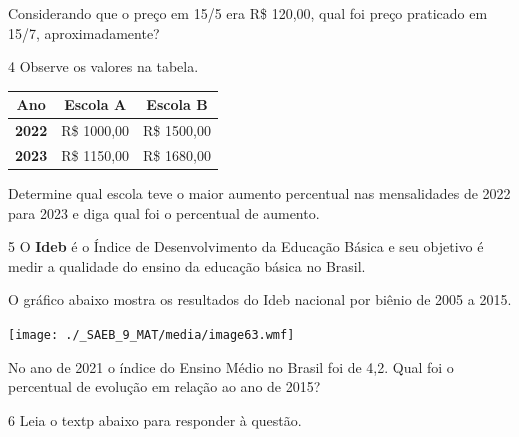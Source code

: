 \begin{escolha}
\begin{boxmedio}
\begin{boxmedio}
{\begin{boxpeq}
\begin{boxpeq}
{\begin{boxpeq}
Considerando que o preço em 15/5 era R\$ 120,00, qual foi preço praticado
em 15/7, aproximadamente?

\begin{boxmedio}

\num{4} Observe os valores na tabela. 

\begin{table}[]
\begin{tabular}{|lll|}
\hline
\multicolumn{1}{|c}{\textbf{Ano}} & \multicolumn{1}{c}{\textbf{Escola A}} & \multicolumn{1}{c|}{\textbf{Escola B}} \\ \hline
\textbf{2022} & R\$ 1000,00 & R\$ 1500,00 \\ \hline
\textbf{2023} & R\$ 1150,00 & R\$ 1680,00 \\ \hline
\end{tabular}
\end{table}

Determine qual escola teve o maior aumento percentual nas mensalidades
de 2022 para 2023 e diga qual foi o percentual de aumento.

\begin{boxmedio}

\num{5} O \textbf{Ideb} é o Índice de Desenvolvimento da
Educação Básica e seu objetivo é medir a qualidade do ensino da
educação básica no Brasil.

O gráfico abaixo mostra os resultados do Ideb nacional por biênio de
2005 a 2015.

\texttt{[image: ./\_SAEB\_9\_MAT/media/image63.wmf]}

No ano de 2021 o índice do Ensino Médio no Brasil foi de 4,2. Qual foi 
o percentual de evolução em relação ao ano de 2015?

\begin{boxpeq}

\num{6} Leia o textp abaixo para responder à questão.


\end{boxpeq}
\end{boxmedio}
\end{boxmedio}
\end{boxpeq}}
\end{boxpeq}
\end{boxpeq}}
\end{boxmedio}
\end{boxmedio}
\end{escolha}
